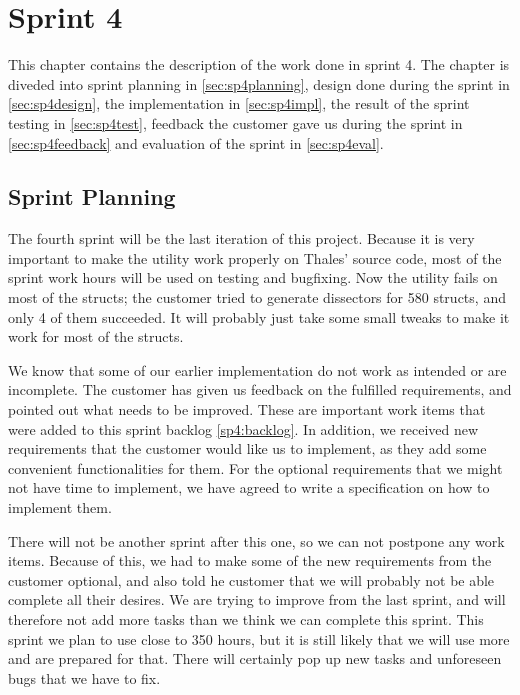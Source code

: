 \chapter{Sprint 4}
This chapter contains the description of the work done in sprint 4. The 
chapter is diveded into sprint planning in \autoref{sec:sp4planning}, design 
done during the sprint in \autoref{sec:sp4design}, the implementation in 
\autoref{sec:sp4impl}, the result of the sprint testing in 
\autoref{sec:sp4test}, feedback the customer gave us during the sprint in 
\autoref{sec:sp4feedback} and evaluation of the sprint in 
\autoref{sec:sp4eval}.

\section{Sprint Planning}
\label{sec:sp4planning}
The fourth sprint will be the last iteration of this project. Because it is very important to make the \gls{utility} work properly on Thales' source code, most of the sprint work hours will be used on testing and bugfixing. Now the \gls{utility} fails on most of the \glspl{struct}; the customer tried to generate \glspl{dissector} for 580 \glspl{struct}, and only 4 of them succeeded. It will probably just take some small tweaks to make it work for most of the \glspl{struct}.

We know that some of our earlier implementation do not work as intended or are incomplete. The customer has given us feedback on the fulfilled requirements, and pointed out what needs to be improved. These are important work items that were added to this sprint backlog \ref{sp4:backlog}. In addition, we received new requirements that the customer would like us to implement, as they add some convenient functionalities for them. For the optional requirements that we might not have time to implement, we have agreed to write a specification on how to implement them. 

There will not be another sprint after this one, so we can not postpone any work items. Because of this, we had to make some of the new requirements from the customer optional, and also told he customer that we will probably not be able complete all their desires. We are trying to improve from the last sprint, and will therefore not add more tasks than we think we can complete this sprint. This sprint we plan to use close to 350 hours, but it is still likely that we will use more and are prepared for that. There will certainly pop up new tasks and unforeseen bugs that we have to fix.


